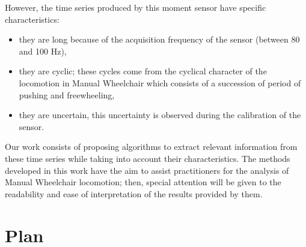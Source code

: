However, the time series produced by this moment sensor have specific characteristics: 
\begin{itemize}
\item they are long because of the acquisition frequency of the sensor (between 80 and 100 Hz),
\item they are cyclic; these cycles come from the cyclical character of the locomotion in Manual Wheelchair which consists of a succession of period of pushing and freewheeling,
\item they are uncertain, this uncertainty is observed during the calibration of the sensor.
\end{itemize}
  

Our work consists of proposing algorithms to extract relevant information from these time series while taking into account their characteristics. The methods developed in this work have the aim to assist practitioners for the analysis of Manual Wheelchair locomotion; then, special attention will be given to the readability and ease of interpretation of the results provided by them.


\section*{Plan}

